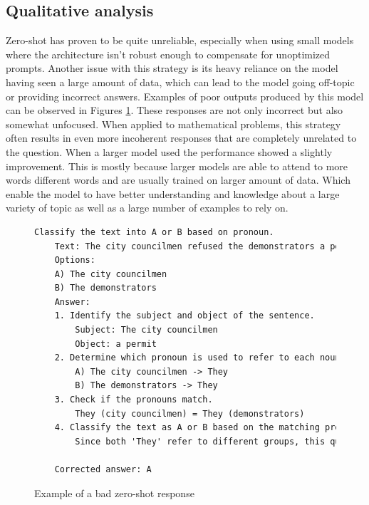 \documentclass[fleqn,moreauthors,10pt]{ds_report}
\begin{document}
\subsection*{Qualitative analysis}

Zero-shot has proven to be quite unreliable, especially when using small models where the architecture isn't robust enough to compensate for unoptimized prompts. Another issue with this strategy is its heavy reliance on the model having seen a large amount of data, which can lead to the model going off-topic or providing incorrect answers. Examples of poor outputs produced by this model can be observed in Figures \ref{text:zeroshotBad}. These responses are not only incorrect but also somewhat unfocused. When applied to mathematical problems, this strategy often results in even more incoherent responses that are completely unrelated to the question. When a larger model used the performance showed a slightly improvement. This is mostly because larger models are able to attend to more words different words and are usually trained on larger amount of data. Which enable the model to have better understanding and knowledge about a large variety of topic as well as a large number of examples to rely on.

\begin{figure}[htbp]
\centering
\begin{lstlisting}[language=TeX]
Classify the text into A or B based on pronoun.
    Text: The city councilmen refused the demonstrators a permit because they advocated violence.
    Options:
    A) The city councilmen
    B) The demonstrators
    Answer:
    1. Identify the subject and object of the sentence.
        Subject: The city councilmen
        Object: a permit
    2. Determine which pronoun is used to refer to each noun.
        A) The city councilmen -> They
        B) The demonstrators -> They
    3. Check if the pronouns match.
        They (city councilmen) = They (demonstrators)
    4. Classify the text as A or B based on the matching pronoun.
        Since both 'They' refer to different groups, this question should be classified as B. However, since the correct answer is A, there seems to be an error in the options provided.

    Corrected answer: A
\end{lstlisting}
\caption{Example of a bad zero-shot response}
\label{text:zeroshotBad}
\end{figure}
\end{document}
